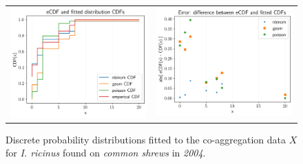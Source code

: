 \documentclass{article}
\begin{document}
\begin{figure}[]
	\begin{mdframed}[backgroundcolor=grey250,rightline=false,leftline=false,topline=false]
	\centering
	\begin{tabular}{ll}
		\includegraphics[width=.48\linewidth,valign=m]{CDF_compare_2004_I.ricinus_SA} & \includegraphics[width=.48\linewidth,valign=m]{CDF_errors_2004_I.ricinus_SA}
	\end{tabular}
	\caption{Discrete probability distributions fitted to the co-aggregation data $ X $ for \textit{I. ricinus} found on \textit{common shrews} in \textit{2004}.}
	\label{fig:CDF_2004_iricinus_SA}
	\end{mdframed}
\end{figure}
\end{document}
